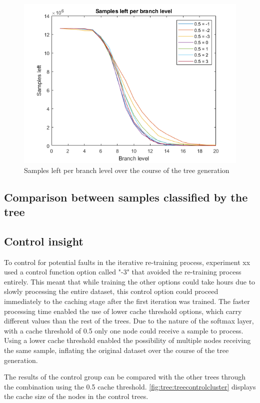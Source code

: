 \begin{figure}  %
  \centering
  \includegraphics[width=.7\textwidth]{figures/treesampleloss.png}
  \caption{Samples left per branch level over the course of the tree generation}
  \label{fig:tree:sampleloss}
\end{figure}

\subsection{Comparison between samples classified by the tree}


\subsection{Control insight}
To control for potential faults in the iterative re-training process, experiment xx used a control function option called "-3" that avoided the re-training process entirely.
This meant that while training the other options could take hours due to slowly processing the entire dataset, this control option could proceed immediately to the caching stage after the first iteration was trained.
The faster processing time enabled the use of lower cache threshold options, which carry different values than the rest of the trees.
Due to the nature of the softmax layer, with a cache threshold of 0.5 only one node could receive a sample to process.
Using a lower cache threshold enabled the possibility of multiple nodes receiving the same sample, inflating the original dataset over the course of the tree generation.

The results of the control group can be compared with the other trees through the combination using the 0.5 cache threshold.
\cref{fig:tree:treecontrolcluster} displays the cache size of the nodes in the control trees.

